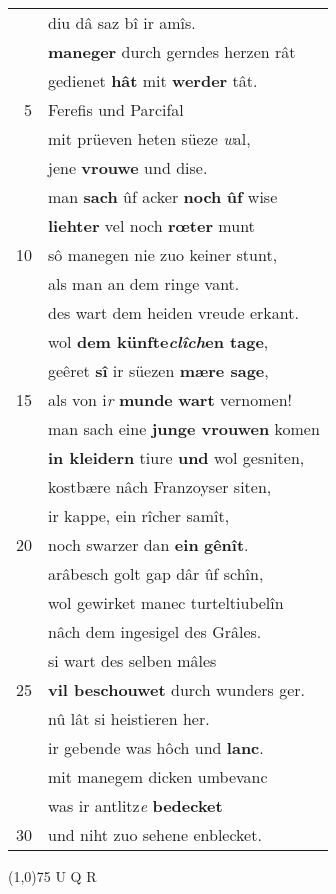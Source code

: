 \documentclass[8pt,a4paper,notitlepage]{article}
\begin{document}
\begin{table}[ht]
\begin{minipage}[t]{0.5\linewidth}
\begin{tabular}{rl}
 & diu dâ saz bî ir amîs.\\ 
 & \textbf{maneger} durch gerndes herzen rât\\ 
 & gedienet \textbf{hât} mit \textbf{werder} tât.\\ 
5 & Ferefis und Parcifal\\ 
 & mit prüeven heten süeze \textit{w}al,\\ 
 & jene \textbf{vrouwe} und dise.\\ 
 & man \textbf{sach} ûf acker \textbf{noch} \textbf{ûf} wise\\ 
 & \textbf{liehter} vel noch \textbf{rœter} munt\\ 
10 & sô manegen nie zuo keiner stunt,\\ 
 & als man an dem ringe vant.\\ 
 & des wart dem heiden vreude erkant.\\ 
 & wol \textbf{dem künfte\textit{clîch}en tage},\\ 
 & geêret \textbf{sî} ir süezen \textbf{mære sage},\\ 
15 & als von i\textit{r} \textbf{munde} \textbf{wart} vernomen!\\ 
 & man sach eine \textbf{junge vrouwen} komen\\ 
 & \textbf{in kleidern} tiure \textbf{und} wol gesniten,\\ 
 & kostbære nâch Franzoyser siten,\\ 
 & ir kappe, ein rîcher samît,\\ 
20 & noch swarzer dan \textbf{ein} \textbf{gênît}.\\ 
 & arâbesch golt gap dâr ûf schîn,\\ 
 & wol gewirket manec turteltiubelîn\\ 
 & nâch dem ingesigel des Grâles.\\ 
 & si wart des selben mâles\\ 
25 & \textbf{vil beschouwet} durch wunders ger.\\ 
 & nû lât si heistieren her.\\ 
 & ir gebende was hôch und \textbf{lanc}.\\ 
 & mit manegem dicken umbevanc\\ 
 & was ir antlitz\textit{e} \textbf{bedecket}\\ 
30 & und niht zuo sehene enblecket.\\ 
\end{tabular}
\scriptsize
\line(1,0){75} \newline
U Q R \newline

\end{minipage}
\end{table}
\end{document}
